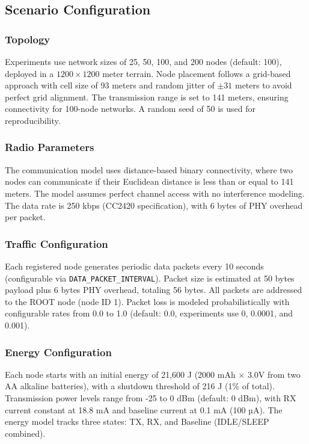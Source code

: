 \documentclass[conference]{IEEEtran}
\begin{document}
\subsection{Scenario Configuration}

\subsubsection{Topology}
Experiments use network sizes of 25, 50, 100, and 200 nodes (default: 100), deployed in a $1200 \times 1200$ meter terrain. Node placement follows a grid-based approach with cell size of 93 meters and random jitter of $\pm 31$ meters to avoid perfect grid alignment. The transmission range is set to 141 meters, ensuring connectivity for 100-node networks. A random seed of 50 is used for reproducibility.

\subsubsection{Radio Parameters}
The communication model uses distance-based binary connectivity, where two nodes can communicate if their Euclidean distance is less than or equal to 141 meters. The model assumes perfect channel access with no interference modeling. The data rate is 250 kbps (CC2420 specification), with 6 bytes of PHY overhead per packet.

\subsubsection{Traffic Configuration}
Each registered node generates periodic data packets every 10 seconds (configurable via \texttt{DATA\_PACKET\_INTERVAL}). Packet size is estimated at 50 bytes payload plus 6 bytes PHY overhead, totaling 56 bytes. All packets are addressed to the ROOT node (node ID 1). Packet loss is modeled probabilistically with configurable rates from 0.0 to 1.0 (default: 0.0, experiments use 0, 0.0001, and 0.001).

\subsubsection{Energy Configuration}
Each node starts with an initial energy of 21,600 J (2000 mAh $\times$ 3.0V from two AA alkaline batteries), with a shutdown threshold of 216 J (1\% of total). Transmission power levels range from -25 to 0 dBm (default: 0 dBm), with RX current constant at 18.8 mA and baseline current at 0.1 mA (100 µA). The energy model tracks three states: TX, RX, and Baseline (IDLE/SLEEP combined).
\end{document}
